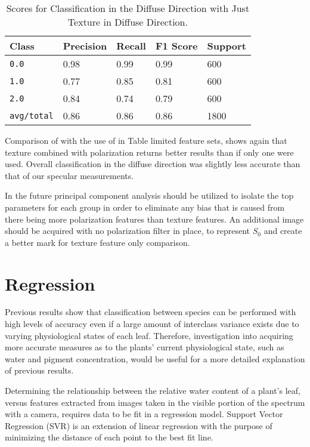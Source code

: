 %
\begin{table}[htb]
  \centering
  \begin{tabular}{lllll}
    \toprule
    \textbf{Class} & \textbf{Precision} & \textbf{Recall} & \textbf{F1 Score} & Support\\
    \midrule
      \texttt{0.0} & 0.98 & 0.99 & 0.99 & 600 \\
      \texttt{1.0} & 0.77 & 0.85 & 0.81 & 600 \\
      \texttt{2.0} & 0.84 & 0.74 & 0.79 & 600 \\
      \texttt{avg/total} & 0.86 & 0.86 & 0.86 & 1800 \\
    \bottomrule
  \end{tabular}
  \caption{%
    Scores for Classification in the Diffuse Direction with Just Texture in Diffuse Direction.
  }
  \label{tab:Packages}
\end{table}
%
Comparison of with the use of in Table limited feature sets, shows again that texture combined with polarization returns better results than if only one were used.  Overall classification in the diffuse direction was slightly less accurate than that of our specular measurements.

In the future principal component analysis should be utilized to isolate the top parameters for each group in order to eliminate any bias that is caused from there being more polarization features than texture features. An additional image should be acquired with no polarization filter in place, to represent $S_0$ and create a better mark for texture feature only comparison.

\section{Regression}
Previous results show that classification between species can be performed with high levels of accuracy even if a large amount of interclass variance exists due to varying physiological states of each leaf.  Therefore, investigation into acquiring more accurate measures as to the plants' current physiological state, such as water and pigment concentration, would be useful for a more detailed explanation of previous results.

Determining the relationship between the relative water content of a plant's leaf, versus features extracted from images taken in the visible portion of the spectrum with a camera, requires data to be fit in a regression model.  Support Vector Regression (SVR) is an extension of linear regression with the purpose of minimizing the distance of each point to the best fit line.

